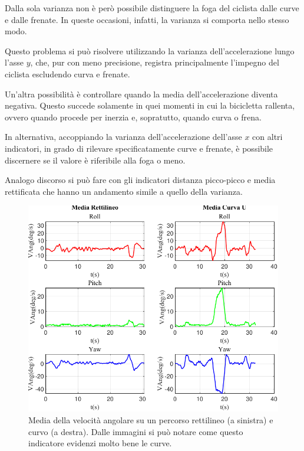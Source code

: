 \documentclass[class=article]{standalone}
\begin{document}
	Dalla sola varianza non è però possibile distinguere la foga del ciclista dalle curve e dalle frenate. In queste occasioni, infatti, la varianza si comporta nello stesso modo.
	
	Questo problema si può risolvere utilizzando la varianza dell'accelerazione lungo l'asse \(y\), che, pur con meno precisione, registra principalmente l'impegno del ciclista escludendo curva e frenate.
	
	Un'altra possibilità è controllare quando la media dell'accelerazione diventa negativa. Questo succede solamente in quei momenti in cui la bicicletta rallenta, ovvero quando procede per inerzia e, sopratutto, quando curva o frena.	
	
	In alternativa, accoppiando la varianza dell'accelerazione dell'asse \(x\) con altri indicatori, in grado di rilevare specificatamente curve e frenate, è possibile discernere se il valore è riferibile alla foga o meno.
	
	Analogo discorso si può fare con gli indicatori distanza picco-picco e media rettificata che hanno un andamento simile a quello della varianza.\hfill\break
	
	\begin{center}
		\begin{figure}[h!]
			\centering\includegraphics[width=.7\textwidth]{img/LungaCurvaU/VAng/Media}
			\caption[]{Media della velocità angolare su un percorso rettilineo (a sinistra) e curvo (a destra). Dalle immagini si può notare come questo indicatore evidenzi molto bene le curve.}
			\label{fig:VAngMedia_LungaCurvaU}
		\end{figure}
	\end{center}
	
\end{document}
